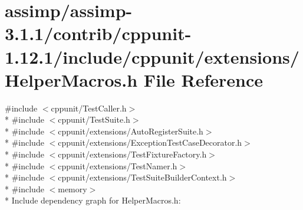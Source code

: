 \hypertarget{assimp_2assimp-3_81_81_2contrib_2cppunit-1_812_81_2include_2cppunit_2extensions_2_helper_macros_8h}{\section{assimp/assimp-\/3.1.1/contrib/cppunit-\/1.12.1/include/cppunit/extensions/\+Helper\+Macros.h File Reference}
\label{assimp_2assimp-3_81_81_2contrib_2cppunit-1_812_81_2include_2cppunit_2extensions_2_helper_macros_8h}
}
{\ttfamily \#include $<$cppunit/\+Test\+Caller.\+h$>$}\\*
{\ttfamily \#include $<$cppunit/\+Test\+Suite.\+h$>$}\\*
{\ttfamily \#include $<$cppunit/extensions/\+Auto\+Register\+Suite.\+h$>$}\\*
{\ttfamily \#include $<$cppunit/extensions/\+Exception\+Test\+Case\+Decorator.\+h$>$}\\*
{\ttfamily \#include $<$cppunit/extensions/\+Test\+Fixture\+Factory.\+h$>$}\\*
{\ttfamily \#include $<$cppunit/extensions/\+Test\+Namer.\+h$>$}\\*
{\ttfamily \#include $<$cppunit/extensions/\+Test\+Suite\+Builder\+Context.\+h$>$}\\*
{\ttfamily \#include $<$memory$>$}\\*
Include dependency graph for Helper\+Macros.\+h\+:
